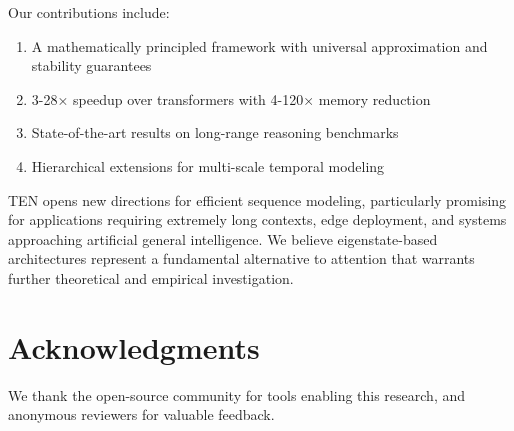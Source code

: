 \documentclass[11pt,letterpaper]{article}
\begin{document}
Our contributions include:
\begin{enumerate}
    \item A mathematically principled framework with universal approximation and stability guarantees
    \item 3-28× speedup over transformers with 4-120× memory reduction
    \item State-of-the-art results on long-range reasoning benchmarks
    \item Hierarchical extensions for multi-scale temporal modeling
\end{enumerate}

TEN opens new directions for efficient sequence modeling, particularly promising for applications requiring extremely long contexts, edge deployment, and systems approaching artificial general intelligence. We believe eigenstate-based architectures represent a fundamental alternative to attention that warrants further theoretical and empirical investigation.

\section*{Acknowledgments}

We thank the open-source community for tools enabling this research, and anonymous reviewers for valuable feedback.
\end{document}
